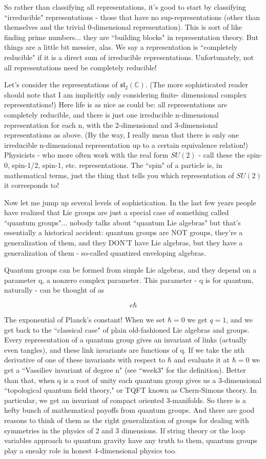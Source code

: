 So rather than classifying all representations, it's good to start by classifying ``irreducible" representations - those that have no sup-representations (other than themselves and the trivial 0-dimensional representation). This is sort of like finding prime numbers... they are ``building blocks" in representation theory. But things are a little bit messier, alas. We say a representation is ``completely reducible" if it is a direct sum of irreducible representations. Unfortunately, not all representations need be completely reducible!

Let's consider the representations of $\mathfrak{sl}_2(\mathbb{C})$. (The more sophisticated reader should note that I am implicitly only considering finite- dimensional complex representations!) Here life is as nice as could be: all representations are completely reducible, and there is just one irreducible n-dimensional representation for each n, with the 2-dimensional and 3-dimensional representations as above. (By the way, I really mean that there is only one irreducible n-dimensional representation up to a certain equivalence relation!) Physicists - who more often work with the real form $SU(2)$ - call these the spin-0, spin-1/2, spin-1, etc. representations. The ``spin" of a particle is, in mathematical terms, just the thing that tells you which representation of $SU(2)$ it corresponds to!

Now let me jump up several levels of sophistication. In the last few years people have realized that Lie groups are just a special case of something called ``quantum groups"... nobody talks about ``quantum Lie algebras" but that's essentially a historical accident: quantum groups are NOT groups, they're a generalization of them, and they DON'T have Lie algebras, but they have a generalization of them - so-called quantized enveloping algebras.

Quantum groups can be formed from simple Lie algebras, and they depend on a parameter q, a nonzero complex parameter. This parameter - q is for quantum, naturally - can be thought of as

$$e\hbar$$

The exponential of Planck's constant! When we set $\hbar = 0$ we get $q = 1$, and we get back to the ``classical case" of plain old-fashioned Lie algebras and groups. Every representation of a quantum group gives an invariant of links (actually even tangles), and these link invariants are functions of q. If we take the nth derivative of one of these invariants with respect to $\hbar$ and evaluate it at $\hbar = 0$ we get a ``Vassiliev invariant of degree n" (see ``week3" for the definition). Better than that, when q is a root of unity each quantum group gives us a 3-dimensional ``topological quantum field theory," or TQFT known as Chern-Simons theory. In particular, we get an invariant of compact oriented 3-manifolds. So there is a hefty bunch of mathematical payoffs from quantum groups. And there are good reasons to think of them as the right generalization of groups for dealing with symmetries in the physics of 2 and 3 dimensions. If string theory or the loop variables approach to quantum gravity have any truth to them, quantum groups play a sneaky role in honest 4-dimensional physics too.


